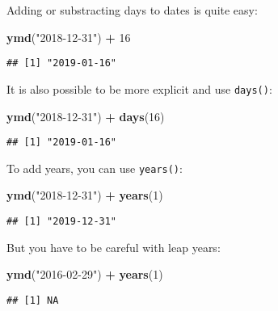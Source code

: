 \documentclass[
]{article}
\newenvironment{Shaded}{\begin{snugshade}}{\end{snugshade}}
\newcommand{\DecValTok}[1]{\textcolor[rgb]{0.00,0.00,0.81}{#1}}
\newcommand{\KeywordTok}[1]{\textcolor[rgb]{0.13,0.29,0.53}{\textbf{#1}}}
\newcommand{\NormalTok}[1]{#1}
\newcommand{\OperatorTok}[1]{\textcolor[rgb]{0.81,0.36,0.00}{\textbf{#1}}}
\newcommand{\StringTok}[1]{\textcolor[rgb]{0.31,0.60,0.02}{#1}}
\begin{document}
Adding or substracting days to dates is quite easy:

\begin{Shaded}
\begin{Highlighting}[]
\KeywordTok{ymd}\NormalTok{(}\StringTok{"2018{-}12{-}31"}\NormalTok{) }\OperatorTok{+}\StringTok{ }\DecValTok{16}
\end{Highlighting}
\end{Shaded}

\begin{verbatim}
## [1] "2019-01-16"
\end{verbatim}

It is also possible to be more explicit and use \texttt{days()}:

\begin{Shaded}
\begin{Highlighting}[]
\KeywordTok{ymd}\NormalTok{(}\StringTok{"2018{-}12{-}31"}\NormalTok{) }\OperatorTok{+}\StringTok{ }\KeywordTok{days}\NormalTok{(}\DecValTok{16}\NormalTok{)}
\end{Highlighting}
\end{Shaded}

\begin{verbatim}
## [1] "2019-01-16"
\end{verbatim}

To add years, you can use \texttt{years()}:

\begin{Shaded}
\begin{Highlighting}[]
\KeywordTok{ymd}\NormalTok{(}\StringTok{"2018{-}12{-}31"}\NormalTok{) }\OperatorTok{+}\StringTok{ }\KeywordTok{years}\NormalTok{(}\DecValTok{1}\NormalTok{)}
\end{Highlighting}
\end{Shaded}

\begin{verbatim}
## [1] "2019-12-31"
\end{verbatim}

But you have to be careful with leap years:

\begin{Shaded}
\begin{Highlighting}[]
\KeywordTok{ymd}\NormalTok{(}\StringTok{"2016{-}02{-}29"}\NormalTok{) }\OperatorTok{+}\StringTok{ }\KeywordTok{years}\NormalTok{(}\DecValTok{1}\NormalTok{)}
\end{Highlighting}
\end{Shaded}

\begin{verbatim}
## [1] NA
\end{verbatim}
\end{document}
